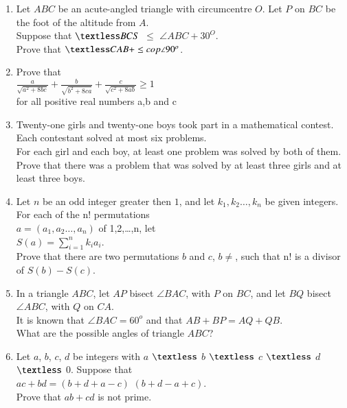 \documentclass[12pt,-letter paper]{article}
\providecommand{\brak}[1]{\ensuremath{\left(#1\right)}}
\begin{document}
\begin{enumerate}
\item Let $ABC$ be an acute-angled triangle with circumcentre $O$. Let $P$ on $BC$ be the foot of the altitude from $A$.\\Suppose that $\textless BCS$ $\leq$ $\angle ABC+30^O$.\\Prove that $\textless CAB+\leq cop \angle 90^o$.
\item Prove that
	\\ $\frac{a}{\sqrt{a^{2}+8bc}}+\frac{b}{\sqrt{b^{2}+8ca}}+\frac{c}{\sqrt{c^{2}+8ab}}\geq{1}$ \\ for all positive real numbers a,b and c	
\item Twenty-one girls and twenty-one boys took part in a mathematical contest.
	\\ Each contestant solved at most six problems. 
	\\ For each girl and each boy, at least one problem was solved by both of them.
\\Prove that there was a problem that was solved by at least three girls and at least three boys. 
\item Let $n$ be an odd integer greater then $1$, and let $k_{1}, k_{2}\ldots,k_{n}$ be given integers. For each of the n! permutations \\ $a=\brak{a_{1}, a_{2}\ldots,a_{n}}$ of 1,2,\ldots,n, let
     \\ $S\brak{a}=\sum_{i=1}^{n}k_{i}a_{i}$.
		\\Prove that there are two permutations $b$ and $c$, $b\neq$, such that n!
 is a divisor of $S\brak{b}-S\brak{c}$.
\item In a triangle $ABC$, let $AP$ bisect $\angle BAC$, with $P$ on $BC$, and let $BQ$ bisect $\angle ABC$, with $Q$ on $CA$.\\ It is known that $\angle BAC=60^o$ and that $AB+BP=AQ+QB$.\\ What are the possible angles of triangle $ABC$?
\item Let $a$, $b$, $c$, $d$ be integers with $a$ $\textless$ $b$ $\textless$ $c$ $\textless$ $d$ $\textless$ $0$. Suppose that \\ $ac+bd=\brak{b+d+a-c}$ $\brak{b+d-a+c}$.\\Prove that $ab+cd$ is not prime.	
\end{enumerate}
\end{document}

